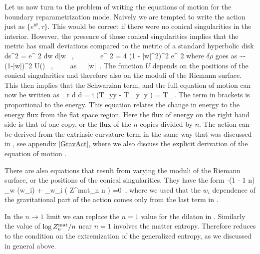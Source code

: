   Let us now turn to the problem of writing the equations of motion for the boundary reparametrization mode.  
  Naively we are tempted to write the action just as    $\{ e^{ i\theta } , \tau \}$. This would be correct if there were no conical singularities in the interior. However, the presence of those conical singularities implies that the metric  has small deviations
    compared to the metric of a standard hyperbolic disk 
    \be {}
    ds^2 = e^{ 2 \rho} dw d\bar w ~,~~~~~~~ e^{ 2 \rho} = { 4 \over (1 - |w|^2)^2 } e^{ 2 \delta \rho } 
    \ee
    where $\delta \rho $ goes as 
    \be {}
     \delta \rho  \sim -{ (1-|w|)^2  } U(\theta)  ~,~~~~~{\rm as}~~~|w| \,.
     \ee 
   The function $U$ depends on the positions of the conical singularities and therefore also on
   the moduli of the Riemann surface. 
   This then implies that the Schwarzian term, and the full equation of motion can now be written as 
   \be {}
   { \phi_r  \pi } { d \over d \tau }  = i (T_{yy} - T_{\bar y \bar y } ) = T_{\tau \sigma}\,.
   \ee
   The term in brackets is proportional to the energy.  This equation relates the change in energy  to the energy flux from the flat space region. Here the flux of energy on the right hand side is that of one copy, or the flux of the $n$ copies divided by $n$. 
   The action can be derived from the extrinsic curvature term in the same way that was discussed in 
  \cite{Jensen:2016pah,Maldacena:2016upp,Engelsoy:2016xyb}, see appendix \ref{GravAct}, where we also discuss the 
  explicit derivation of the equation of motion . 
   
   There are also equations that result from varying the moduli of the Riemann surface, or the 
   positions of the conical singularities. They  have the form 
   \be {}
    -(1 - { 1 \over n}) \partial_{w} \phi(w_i) + \partial_{w_i } \left( { \log Z^{\rm mat}_n \over n } \right) =0 \,,
   \ee 
   where we used that the $w_i$ dependence of the gravitational part of the action comes only from the last term in .   
  
  In the $n\to 1$ limit we can replace the $n=1$ value for the dilaton in 
   . Similarly the value of $\log Z^{\rm mat}_n/n$ near $n=1$ involves the matter entropy. 
   Therefore   reduces to the condition on the extremization of the generalized 
   entropy, as we discussed in general above. 
   
